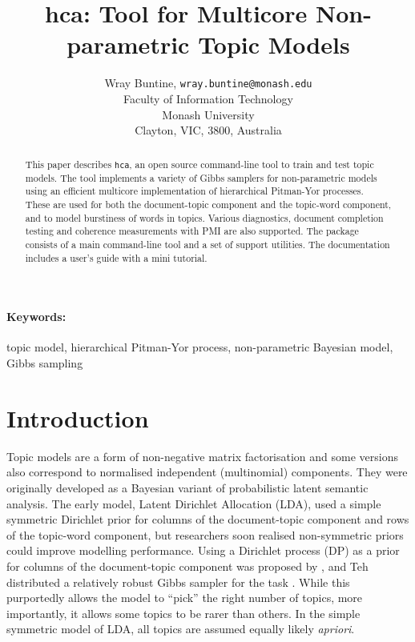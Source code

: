 \documentclass[twoside,11pt]{article}
\begin{document}
\title{hca: Tool for Multicore Non-parametric Topic Models}

\author{Wray Buntine, {\tt wray.buntine@monash.edu} \\
       Faculty of Information Technology \\
       Monash University\\
       Clayton, VIC, 3800, Australia}


\maketitle

\begin{abstract}%
This paper describes {\tt hca}, an open source command-line tool to
train and test topic models.  The tool implements a variety of Gibbs
samplers for non-parametric models using an efficient multicore
implementation
of hierarchical Pitman-Yor processes.  These are used for both the
document-topic component and the topic-word component, and to model
burstiness of words in topics.  Various diagnostics, document
completion testing and coherence measurements with PMI are also
supported.  The package consists of a main command-line tool
and a set of support utilities. The documentation includes a user's
guide with a mini tutorial.
\end{abstract}

\paragraph{Keywords:}
  topic model, hierarchical Pitman-Yor process, non-parametric Bayesian model,
  Gibbs sampling

\section{Introduction}
Topic models are a form of non-negative matrix factorisation
and some versions also correspond to normalised independent
(multinomial) components.
They were originally developed
as a Bayesian variant of probabilistic latent semantic analysis.
The early model, Latent Dirichlet Allocation (LDA),
used a simple symmetric Dirichlet prior for columns of the
document-topic component and rows of the topic-word component, but
researchers soon realised non-symmetric priors could
improve modelling performance.  Using a Dirichlet process (DP) as a prior
for columns of the document-topic component was proposed by
\cite{TehJorBea2006}, and Teh distributed a relatively robust Gibbs
sampler for the task \cite{TehNBMM21}.  While this
purportedly allows the
model to ``pick'' the right number of topics, more importantly,
it allows some topics to be rarer than others.
In the simple symmetric model of LDA,
all topics are assumed equally likely {\it apriori}.
\end{document}
